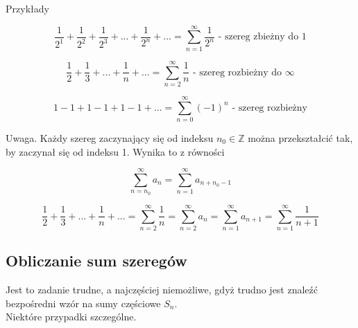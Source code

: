 \documentclass[12pt]{article}
\begin{document}
Przykłady

$$ \frac{1}{2^1} + \frac{1}{2^2} + \frac{1}{2^3} + ... + \frac{1}{2^n} + ... = \sum\limits_{n = 1}^{\infty} \frac{1}{2^n} 
\textrm { - szereg zbieżny do 1}$$

$$ \frac{1}{2} + \frac{1}{3} + ... + \frac{1}{n} + ... = \sum\limits_{n = 2}^{\infty} \frac{1}{n} 
\textrm { - szereg rozbieżny do } \infty$$

$$ 1 - 1 + 1 - 1 + 1 - 1 + ... = \sum\limits_{n = 0}^{\infty} (-1)^n \textrm{ - szereg rozbieżny} $$

Uwaga. Każdy szereg zaczynający się od indeksu $ n_0 \in \mathbb{Z} $ można przekształcić tak, by zaczynał się od indeksu 1.
Wynika to z równości

$$ \sum\limits_{n = n_0}^{\infty} a_n = \sum\limits_{n = 1}^{\infty} a_{n + n_0 - 1} $$

$$ \frac{1}{2} + \frac{1}{3} + ... + \frac{1}{n} + ... = \sum\limits_{n = 2}^{\infty} \frac{1}{n} = \sum\limits_{n = 2}^{\infty} a_n
= \sum\limits_{n = 1}^{\infty} a_{n + 1} = \sum\limits_{n = 1}^{\infty} \frac{1}{n + 1} $$

\subsection*{Obliczanie sum szeregów}

Jest to zadanie trudne, a najczęściej niemożliwe, gdyż trudno jest znaleźć bezpośredni wzór na sumy częściowe $S_n$. \\

Niektóre przypadki szczególne.
\end{document}
